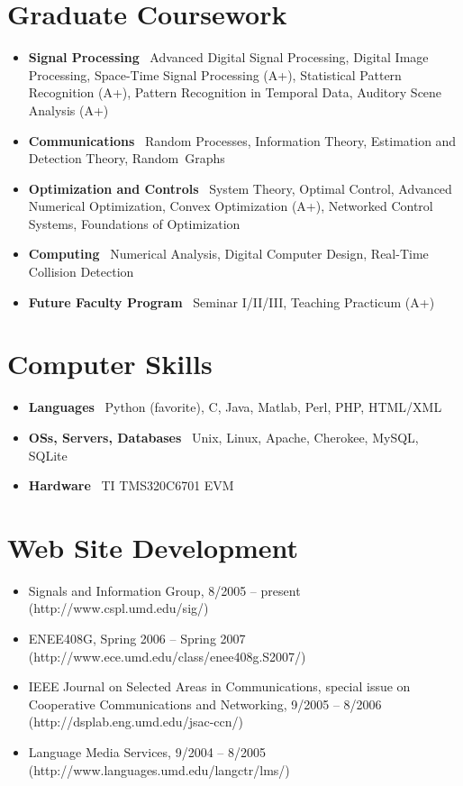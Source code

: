 \documentclass[10pt,letterpaper]{article}
\begin{document}
\section*{Graduate Coursework}

\begin{itemize}

\item \textbf{Signal Processing} \ Advanced Digital Signal Processing, Digital Image Processing, Space-Time Signal Processing (A+), Statistical Pattern Recognition (A+), Pattern Recognition in Temporal Data, Auditory Scene Analysis (A+)

\item \textbf{Communications} \ Random Processes, Information Theory, Estimation and Detection Theory, Random~Graphs

\item \textbf{Optimization and Controls} \ System Theory, Optimal Control, Advanced Numerical Optimization, Convex Optimization (A+), Networked Control Systems, Foundations of Optimization

\item \textbf{Computing} \ Numerical Analysis, Digital Computer Design, Real-Time Collision Detection

\item \textbf{Future Faculty Program} \ Seminar I/II/III, Teaching Practicum (A+)

\end{itemize}


\section*{Computer Skills}

\begin{itemize}
\item \textbf{Languages} \ Python (favorite), C, Java, Matlab, Perl, PHP, HTML/XML
\item \textbf{OSs, Servers, Databases} \ Unix, Linux, Apache, Cherokee, MySQL, SQLite
\item \textbf{Hardware} \ TI TMS320C6701 EVM
\end{itemize}


\section*{Web Site Development}

\begin{itemize}
\item Signals and Information Group, 8/2005 -- present (http://www.cspl.umd.edu/sig/)
\item ENEE408G, Spring 2006 -- Spring 2007 (http://www.ece.umd.edu/class/enee408g.S2007/)
\item IEEE Journal on Selected Areas in Communications, special issue on Cooperative Communications and Networking, 9/2005 -- 8/2006 (http://dsplab.eng.umd.edu/jsac-ccn/)
\item Language Media Services, 9/2004 -- 8/2005 (http://www.languages.umd.edu/langctr/lms/)
\end{itemize}
\end{document}
